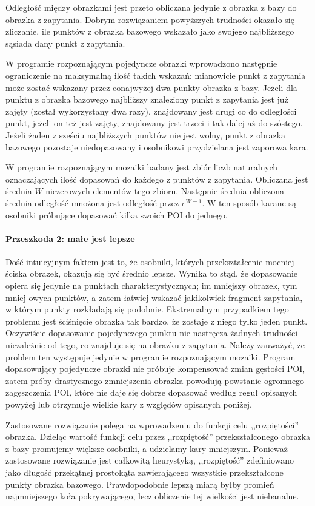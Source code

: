\documentclass[a4paper,12pt,leqno]{article}
\begin{document}
Odległość między obrazkami jest przeto obliczana jedynie z obrazka z bazy do obrazka z zapytania. Dobrym rozwiązaniem powyższych trudności okazało się zliczanie,
ile punktów z obrazka bazowego wskazało jako swojego najbliższego sąsiada dany punkt z zapytania.

W programie rozpoznającym pojedyncze obrazki wprowadzono następnie ograniczenie na maksymalną ilość takich wskazań: mianowicie punkt z zapytania może zostać
wskazany przez conajwyżej dwa punkty obrazka z bazy. Jeżeli dla punktu z obrazka bazowego najbliższy znaleziony punkt z zapytania jest już zajęty (został
wykorzystany dwa razy), znajdowany jest drugi co do odległości punkt, jeżeli on też jest zajęty, znajdowany jest trzeci i tak dalej aż do szóstego. Jeżeli
żaden z sześciu najbliższych punktów nie jest wolny, punkt z obrazka bazowego pozostaje niedopasowany i osobnikowi przydzielana jest zaporowa kara.

W programie rozpoznającym mozaiki badany jest zbiór liczb naturalnych oznaczających ilość dopasowań do każdego z punktów z zapytania. Obliczana jest średnia
$W$ niezerowych elementów tego zbioru. Następnie średnia obliczona średnia odległość mnożona jest odległość przez $e^{W-1}$. W ten sposób karane są
osobniki próbujące dopasować kilka swoich POI do jednego.

\paragraph{Przeszkoda 2: małe jest lepsze}
Dość intuicyjnym faktem jest to, że osobniki, których przekształcenie mocniej ściska obrazek, okazują się być średnio lepsze. Wynika to stąd, że dopasowanie opiera
się jedynie na punktach charakterystycznych; im mniejszy obrazek, tym mniej owych punktów, a zatem łatwiej wskazać jakikolwiek fragment zapytania, w którym punkty
rozkładają się podobnie. Ekstremalnym przypadkiem tego problemu jest ściśnięcie obrazka tak bardzo, że zostaje z niego tylko jeden punkt. Oczywiście dopasowanie
pojedynczego punktu nie nastręcza żadnych trudności niezależnie od tego, co znajduje się na obrazku z zapytania. Należy zauważyć, że problem ten występuje jedynie
w programie rozpoznającym mozaiki. Program dopasowujący pojedyncze obrazki nie próbuje kompensować zmian gęstości POI, zatem próby drastycznego zmniejszenia obrazka
powodują powstanie ogromnego zagęszczenia POI, które nie daje się dobrze dopasować według reguł opisanych powyżej lub otrzymuje wielkie kary z względów opisanych poniżej.

Zastosowane rozwiązanie polega na wprowadzeniu do funkcji celu ,,rozpiętości'' obrazka. Dzieląc wartość funkcji celu przez ,,rozpiętość'' przekształconego obrazka z 
bazy promujemy większe osobniki, a udzielamy kary mniejszym. Ponieważ zastosowane rozwiązanie jest całkowitą heurystyką, ,,rozpiętość'' zdefiniowano jako długość
przekątnej prostokąta zawierającego wszystkie przekształcone punkty obrazka bazowego. Prawdopodobnie lepszą miarą byłby promień najmniejszego koła pokrywającego,
lecz obliczenie tej wielkości jest niebanalne.
\end{document}
